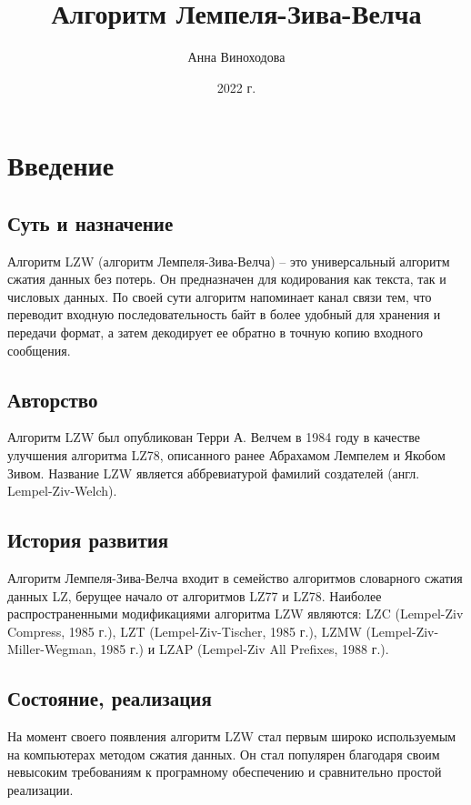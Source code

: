 \documentclass{article}
\title{Алгоритм Лемпеля-Зива-Велча}
\author{Анна Виноходова}
\date{2022 г.}
\begin{document}
\maketitle

\section{Введение}

\subsection{Суть и назначение}

Алгоритм LZW (алгоритм Лемпеля-Зива-Велча) – это универсальный алгоритм сжатия данных без потерь. Он предназначен для кодирования как текста, так и числовых данных. По своей сути алгоритм напоминает канал связи тем, что переводит входную последовательность байт в более удобный для хранения и передачи формат, а затем декодирует ее обратно в точную копию входного сообщения.

\subsection{Авторство}

Алгоритм LZW был опубликован Терри А. Велчем в 1984 году в качестве улучшения алгоритма LZ78, описанного ранее Абрахамом Лемпелем и Якобом Зивом. Название LZW является аббревиатурой фамилий создателей (англ. Lempel-Ziv-Welch).

\subsection{История развития}

Алгоритм Лемпеля-Зива-Велча входит в семейство алгоритмов словарного сжатия данных LZ, берущее начало от алгоритмов LZ77 и LZ78. Наиболее распространенными модификациями алгоритма LZW являются: LZC (Lempel-Ziv Compress, 1985 г.), LZT (Lempel-Ziv-Tischer, 1985 г.), LZMW (Lempel-Ziv-Miller-Wegman, 1985 г.) и LZAP (Lempel-Ziv All Prefixes, 1988 г.).

\subsection{Состояние, реализация}

На момент своего появления алгоритм LZW стал первым широко используемым на компьютерах методом сжатия данных. Он стал популярен благодаря своим невысоким требованиям к програмному обеспечению и сравнительно простой реализации.
\end{document}
